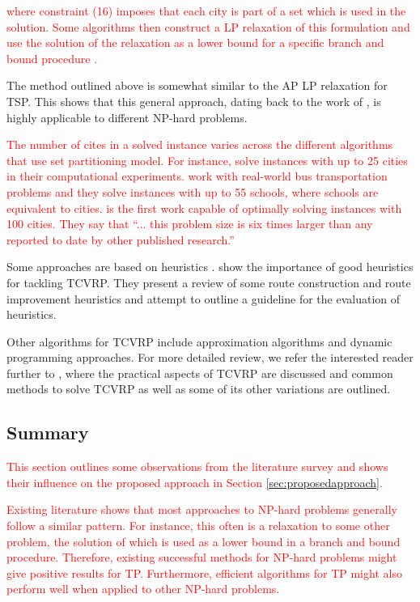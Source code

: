 \documentclass{mprop}
\theoremstyle{definition}
\begin{document}
\textcolor{red}{where constraint (16) imposes that each city is part of a set which is used in the solution. Some algorithms then construct a LP relaxation of this formulation and use the solution of the relaxation as a lower bound for a specific branch and bound procedure \citep{Desrochers92,Agarwal89}.}

The method outlined above is somewhat similar to the AP LP relaxation for TSP. This shows that this general approach, dating back to the work of \citet{Dantzig54}, is highly applicable to different NP-hard problems.

\textcolor{red}{
The number of cites in a solved instance varies across the different algorithms that use set partitioning model. For instance, \citet{Agarwal89} solve instances with up to 25 cities in their computational experiments. \citet{Desrosiers84} work with real-world bus transportation problems and they solve instances with up to 55 schools, where schools are equivalent to cities. \citet{Desrochers92} is the first work capable of optimally solving instances with 100 cities. They say that ``... this problem size is six times larger than any reported to date by other published research.''}

Some approaches are based on heuristics \citep{Alvarenga07,Cheng09}. \citet{Braysy05,Braysy05a} show the importance of good heuristics for tackling TCVRP. They present a review of some route construction and route improvement heuristics and attempt to outline a guideline for the evaluation of heuristics.

Other algorithms for TCVRP include approximation algorithms and dynamic programming approaches. For more detailed review, we refer the interested reader further to \citet{Toth14}, where the practical aspects of TCVRP are discussed and common methods to solve TCVRP as well as some of its other variations are outlined.

\subsection{Summary}
\textcolor{red}{
This section outlines some observations from the literature survey and shows their influence on the proposed approach in Section \ref{sec:proposedapproach}.}

\textcolor{red}{
Existing literature shows that most approaches to NP-hard problems generally follow a similar pattern. For instance, this often is a relaxation to some other problem, the solution of which is used as a lower bound in a branch and bound procedure. Therefore, existing successful methods for NP-hard problems might give positive results for TP. Furthermore, efficient algorithms for TP might also perform well when applied to other NP-hard problems.}
\end{document}
